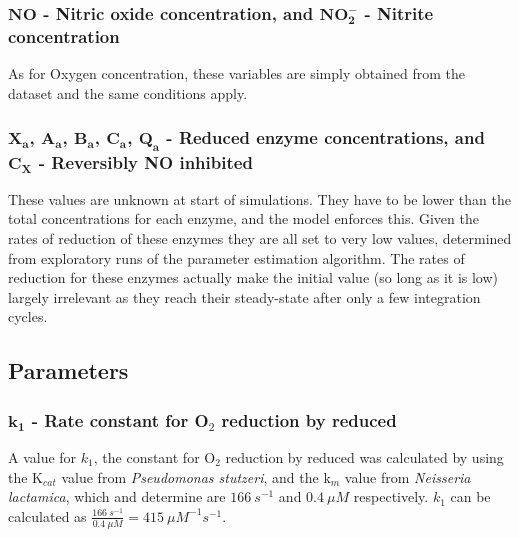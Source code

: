 \subsubsection*{$\mathbf{NO}$ {\bf- Nitric oxide concentration}, and $\mathbf{NO_2^-}$ {\bf- Nitrite concentration}}
As for Oxygen concentration, these variables are simply obtained from the dataset and the same conditions apply.

\subsubsection*{$\mathbf{X_a}$, $\mathbf{A_a}$, $\mathbf{B_a}$, $\mathbf{C_a}$, $\mathbf{Q_a}$ - Reduced enzyme concentrations, and $\mathbf{C_X}$ {\bf- Reversibly NO inhibited \cbbthree{}}}
These values are unknown at start of simulations. They have to be lower than the total concentrations for each enzyme, and the model enforces this. Given the rates of reduction of these enzymes they are all set to very low values, determined from exploratory runs of the parameter estimation algorithm. The rates of reduction for these enzymes actually make the initial value (so long as it is low) largely irrelevant as they reach their steady-state after only a few integration cycles.

\subsection*{Parameters}
\subsubsection*{$\mathbf{k_1}$ {\bf- Rate constant for O$_{\textrm{2}}$ reduction by reduced \cbbthree{}}}

A value for $k_1$, the constant for O$_{\textrm{2}}$ reduction by reduced \cbbthree{} was calculated by using the $\mathrm{K}_{cat}$ value from \textit{Pseudomonas stutzeri}, and the $\textrm{k}_m$ value from \textit{Neisseria lactamica}, which \citet{Forte2001} and \citet{Hunter2007} determine are $166~s^{-1}$ and $0.4~\mu M$ respectively. $k_1$ can be calculated as $\frac{166~s^{-1}}{0.4~\mu M} = 415~\mu M^{-1}s^{-1}$.

